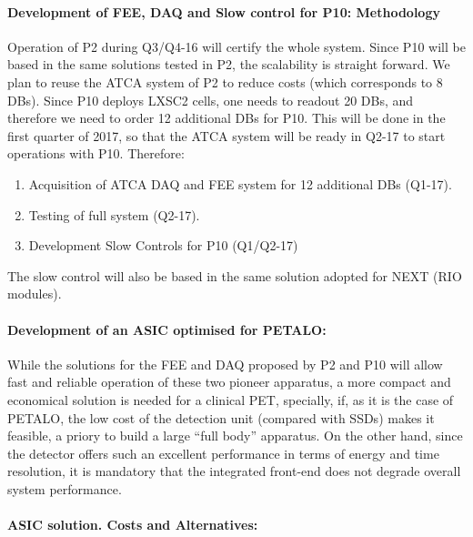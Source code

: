 \paragraph{Development of FEE, DAQ and Slow control for P10: Methodology}

Operation of P2 during Q3/Q4-16 will certify the whole system. Since P10 will be based in the same solutions tested in P2, the scalability is straight forward. We plan to reuse the ATCA system of P2 to reduce costs (which corresponds to 8 DBs). Since P10 deploys LXSC2 cells, one needs to readout 20 DBs, and therefore we need to order 12 additional DBs for P10. This will be done in the first quarter of 2017, so that the ATCA system will be ready in Q2-17 to start operations with P10. Therefore:  

\begin{enumerate}
\item Acquisition of ATCA DAQ and FEE system for 12 additional DBs  (Q1-17).
\item Testing of full system (Q2-17).
\item Development Slow Controls for P10 (Q1/Q2-17)
\end{enumerate}

The slow control will also be based in the same solution adopted for NEXT (RIO modules).

\paragraph{Development of an ASIC optimised for PETALO:}

While the solutions for the FEE and DAQ proposed by P2 and P10 will allow fast and reliable operation of these two pioneer apparatus, a more compact and economical solution is needed for a clinical PET, specially, if, as it is the case of PETALO, the low cost of the detection unit (compared with SSDs) makes it feasible, a priory to build a large ``full body'' apparatus. On the other hand, since the detector offers such an excellent performance in terms of energy and time resolution, it is mandatory that the integrated front-end does not degrade overall system performance.


\paragraph{ASIC solution. Costs and Alternatives:}


